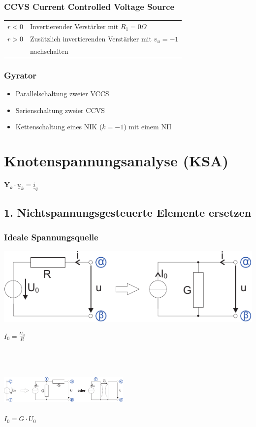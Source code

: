 \documentclass[a4paper,twocolumn,10pt]{article}
\begin{document}
\subsubsection*{CCVS Current Controlled Voltage Source}
\begin{tabular}{ll}
$r<0$ & Invertierender Verstärker mit $R_1=0\Omega$\\
$r>0$ & Zusätzlich invertierenden Verstärker mit $v_u=-1$\\
& nachschalten
\end{tabular}

\subsubsection*{Gyrator}
\begin{itemize}[label=- ,leftmargin=5mm]
	\item Parallelschaltung zweier VCCS
	\item Serienschaltung zweier CCVS
	\item Kettenschaltung eines NIK ($k=-1$) mit einem NII
\end{itemize}

\section*{Knotenspannungsanalyse (KSA)}
$\textbf{Y}_k\cdot \underline{u}_k=\underline{i}_q$

\subsection*{1. Nichtspannungsgesteuerte Elemente ersetzen}
\subsubsection*{Ideale Spannungsquelle}
\begin{minipage}[b]{0.35\textwidth}
\includegraphics[width=\textwidth]{Grafiken/KSA_Quellwandlung}
\end{minipage}
\hfill
\begin{minipage}[b]{0.1\textwidth}
$I_0=\frac{U_0}{R}$\\\\
\end{minipage}\\\\
\includegraphics[width=0.48\textwidth]{Grafiken/KSA_Quellwandlung2}\\\\
$I_0=G\cdot U_0$
\end{document}
